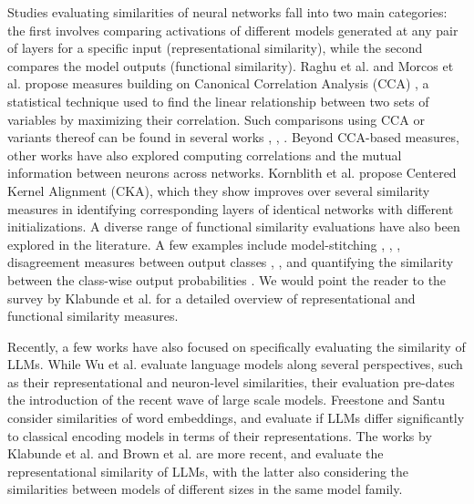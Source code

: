 \documentclass[nonacm,sigconf]{acmart}
\begin{document}
Studies evaluating similarities of neural networks fall into two main categories: the first involves comparing activations of different models generated at any pair of layers for a specific input (representational similarity), while the second compares the model outputs (functional similarity). Raghu et al. \cite{svcca} and Morcos et al. \cite{pwcca} propose measures building on Canonical Correlation Analysis (CCA) \cite{cca}, a statistical technique used to find the linear relationship between two sets of variables by maximizing their correlation. Such comparisons using CCA or variants thereof can be found in several works \cite{cca_app1}, \cite{cca_app2}, \cite{cca_app3}. Beyond CCA-based measures, other works have also explored computing correlations \cite{correlation} and the mutual information \cite{mutual_info} between neurons across networks. Kornblith et al. \cite{cka} propose Centered Kernel Alignment (CKA), which they show improves over several similarity measures in identifying corresponding layers of identical networks with different initializations. A diverse range of functional similarity evaluations have also been explored in the literature. A few examples include model-stitching \cite{stitching_revisited}, \cite{model_stitching}, \cite{model_stitching_robust}, disagreement measures between output classes \cite{churn}, \cite{diffchaser}, and quantifying the similarity between the class-wise output probabilities \cite{model_diff}. We would point the reader to the survey by Klabunde et al. \cite{similarity} for a detailed overview of representational and functional similarity measures.

Recently, a few works have also focused on specifically evaluating the similarity of LLMs. While Wu et al. \cite{contextsimilarity} evaluate language models along several perspectives, such as their representational and neuron-level similarities, their evaluation pre-dates the introduction of the recent wave of large scale models. Freestone and Santu \cite{wordembedding} consider similarities of word embeddings, and evaluate if LLMs differ significantly to classical encoding models in terms of their representations. The works by Klabunde et al. \cite{similarity_llm} and Brown et al. \cite{dissimilarity} are more recent, and evaluate the representational similarity of LLMs, with the latter also considering the similarities between models of different sizes in the same model family.
\end{document}

